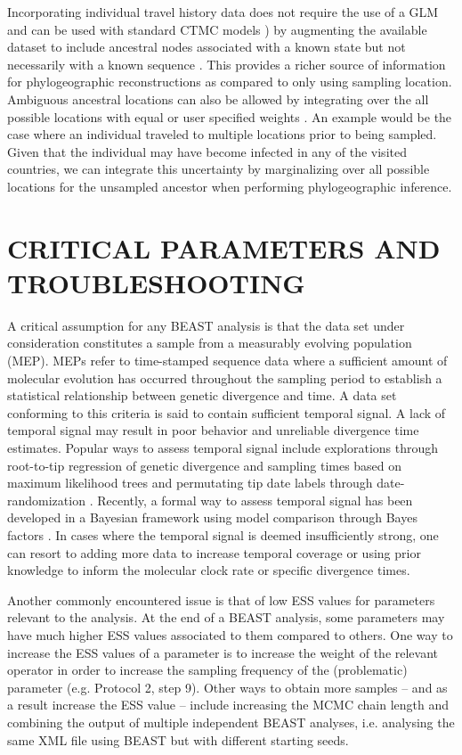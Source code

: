 \documentclass{article}
\begin{document}
\begin{multicols}{2}
Incorporating individual travel history data does not require the use of a GLM and can be used with standard CTMC models \cite{dta}) by augmenting the available dataset to include ancestral nodes associated with a known state but not necessarily with a known sequence \cite{travhist}.
This provides a richer source of information for phylogeographic reconstructions as compared to only using sampling location.
Ambiguous ancestral locations can also be allowed by integrating over the all possible locations with equal or user specified weights \cite{ambig}.
An example would be the case where an individual traveled to multiple locations prior to being sampled.
Given that the individual may have become infected in any of the visited countries, we can integrate this uncertainty by marginalizing over all possible locations for the unsampled ancestor when performing phylogeographic inference.


\section*{CRITICAL PARAMETERS AND TROUBLESHOOTING}
A critical assumption for any BEAST analysis is that the data set under consideration constitutes a sample from a measurably evolving population (MEP). MEPs \cite{mep1,mep2} refer to time-stamped sequence data where a sufficient amount of molecular evolution has occurred throughout the sampling period to establish a statistical relationship between genetic divergence and time. A data set conforming to this criteria is said to contain sufficient temporal signal. A lack of temporal signal may result in poor behavior and unreliable divergence time estimates. Popular ways to assess temporal signal include explorations through root-to-tip regression of genetic divergence and sampling times based on maximum likelihood trees \cite{tempest} and permutating tip date labels through date-randomization \cite{tipdate}. Recently, a formal way to assess temporal signal has been developed in a Bayesian framework using model comparison through Bayes factors \cite{bets}. In cases where the temporal signal is deemed insufficiently strong, one can resort to adding more data to increase temporal coverage or using prior knowledge to inform the molecular clock rate or specific divergence times.

Another commonly encountered issue is that of low ESS values for parameters relevant to the analysis. At the end of a BEAST analysis, some parameters may have much higher ESS values associated to them compared to others. One way to increase the ESS values of a parameter is to increase the weight of the relevant operator in order to increase the sampling frequency of the (problematic) parameter (e.g. Protocol 2, step 9). Other ways to obtain more samples -- and as a result increase the ESS value -- include increasing the MCMC chain length and combining the output of multiple independent BEAST analyses, i.e. analysing the same XML file using BEAST but with different starting seeds.



\end{multicols}
\end{document}
